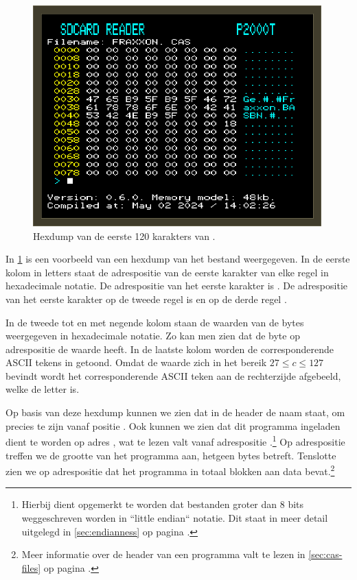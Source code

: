 \begin{figure}[h!]
    \centering
    \includegraphics[width=0.99\textwidth]{img/hexdump-fraxxon.png}
    \caption{Hexdump van de eerste 120 karakters van .}
    \label{fig:screenshot-hexdump-fraxxon}
\end{figure}

In \cref{fig:screenshot-hexdump-fraxxon} is een voorbeeld van een hexdump van het bestand  weergegeven. In de eerste kolom in  letters staat de adrespositie van de eerste karakter van elke regel in hexadecimale notatie. De adrespositie van het eerste karakter is . De adrespositie van het eerste karakter op de tweede regel is  en op de derde regel .

In de tweede tot en met negende kolom staan de waarden van de bytes weergegeven in hexadecimale notatie. Zo kan men zien dat de byte op adrespositie  de waarde  heeft. In de laatste kolom worden de corresponderende ASCII tekens in  getoond. Omdat de waarde  zich in het bereik $27 \leq c \leq 127$ bevindt wordt het corresponderende ASCII teken aan de rechterzijde afgebeeld, welke de letter  is.

Op basis van deze hexdump kunnen we zien dat in de header de naam  staat, om precies te zijn vanaf positie . Ook kunnen we zien dat dit programma ingeladen dient te worden op adres , wat te lezen valt vanaf adrespositie .\footnote{Hierbij dient opgemerkt te worden dat bestanden groter dan 8 bits weggeschreven worden in ``little endian`` notatie. Dit staat in meer detail uitgelegd in \cref{sec:endianness} op pagina \pageref{sec:endianness}.} Op adrespositie  treffen we de grootte van het programma aan, hetgeen  bytes betreft. Tenslotte zien we op adrespositie  dat het programma in totaal  blokken aan data bevat.\footnote{Meer informatie over de header van een  programma valt te lezen in \cref{sec:cas-files} op pagina \pageref{sec:cas-files}.}

